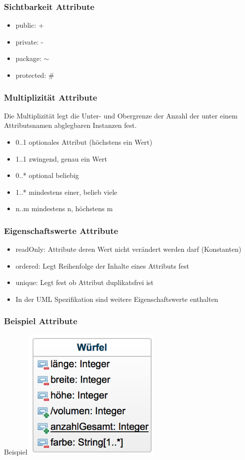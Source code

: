 \begin{frame}
\frametitle{Sichtbarkeit Attribute}
	\begin{itemize}
		\item public: +
		\item private: -
		\item package: $\sim$
		\item protected: \#
	\end{itemize}
\end{frame}

\begin{frame}
\frametitle{Multiplizität Attribute}
	Die Multiplizität legt die Unter- und Obergrenze der Anzahl der unter einem Attributsnamen
	abglegbaren Instanzen fest.\\
	\begin{itemize}
		\item 0..1 optionales Attribut (höchstens ein Wert)
		\item 1..1 zwingend, genau ein Wert
		\item 0..* optional beliebig
		\item 1..* mindestens einer, belieb viele
		\item n..m mindestens n, höchstens m
	\end{itemize}
\end{frame}

\begin{frame}
\frametitle{Eigenschaftswerte Attribute}
	\begin{itemize}
		\item readOnly: Attribute deren Wert nicht verändert werden darf (Konstanten)
		\item ordered: Legt Reihenfolge der Inhalte eines Attributs fest
		\item unique: Legt fest ob Attribut duplikatsfrei ist
		\item In der UML Spezifikation sind weitere Eigenschaftswerte enthalten
	\end{itemize}
\end{frame}

\begin{frame}
\frametitle{Beispiel Attribute}
	Beispiel
	\center
	\includegraphics[width=0.5\textwidth,
	keepaspectratio=true]{bilder/attribute_beispiel.png}
\end{frame}

